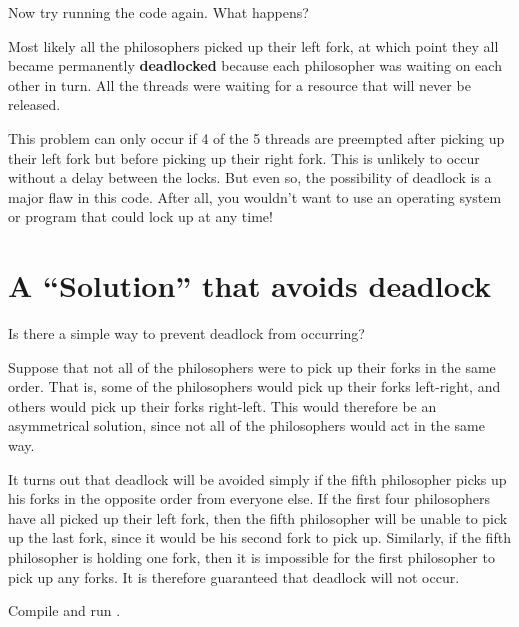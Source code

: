 \documentclass[letterpaper,10pt,openany,oneside]{sphinxmanual}
\begin{document}
Now try running the code again. What happens?

Most likely all the philosophers picked up their left fork, at
which point they all became permanently \textbf{deadlocked} because each
philosopher was waiting on each other in turn. All the threads were
waiting for a resource that will never be released.

This problem can only occur if 4 of the 5 threads are preempted
after picking up their left fork but before picking up their right
fork. This is unlikely to occur without a delay between the locks.
But even so, the possibility of deadlock is a major flaw in this
code. After all, you wouldn't want to use an operating system or
program that could lock up at any time!


\section{A ``Solution'' that avoids deadlock}
\label{SharedMemory/SharedMemory:a-solution-that-avoids-deadlock}
Is there a simple way to prevent deadlock from occurring?

Suppose that not all of the philosophers were to pick up their
forks in the same order. That is, some of the philosophers would
pick up their forks left-right, and others would pick up their
forks right-left. This would therefore be an asymmetrical solution,
since not all of the philosophers would act in the same way.

It turns out that deadlock will be avoided simply if the fifth
philosopher picks up his forks in the opposite order from everyone
else. If the first four philosophers have all picked up their left
fork, then the fifth philosopher will be unable to pick up the last
fork, since it would be his second fork to pick up. Similarly, if
the fifth philosopher is holding one fork, then it is impossible
for the first philosopher to pick up any forks. It is therefore
guaranteed that deadlock will not occur.

Compile and run .
\end{document}
